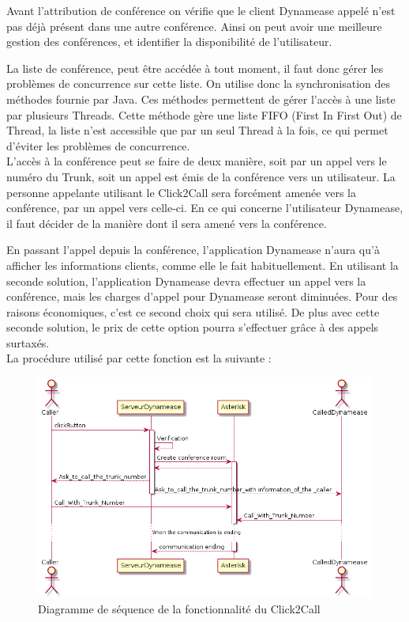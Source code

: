 Avant l'attribution de conférence on vérifie que le client Dynamease appelé n'est pas déjà présent dans une autre conférence. Ainsi on peut avoir une meilleure gestion des conférences, et identifier la disponibilité de l'utilisateur.

La liste de conférence, peut être accédée à tout moment, il faut donc gérer les problèmes de concurrence sur cette liste. On utilise donc la synchronisation des méthodes fournie par Java. Ces méthodes permettent de gérer l'accès à une liste par plusieurs Threads. Cette méthode gère une liste FIFO (First In First Out) de Thread, la liste n'est accessible que par un seul Thread à la fois, ce qui permet d'éviter les problèmes de concurrence.\\

L'accès à la conférence peut se faire de deux manière, soit par un appel vers le numéro du Trunk, soit un appel est émis de la conférence vers un utilisateur. La personne appelante utilisant le Click2Call sera forcément amenée vers la conférence, par un appel vers celle-ci. En ce qui concerne l'utilisateur Dynamease, il faut décider de la manière dont il sera amené vers la conférence. 

En passant l'appel depuis la conférence, l'application Dynamease n'aura qu'à afficher les informations clients, comme elle le fait habituellement. En utilisant la seconde solution, l'application Dynamease devra effectuer un appel vers la conférence, mais les charges d'appel pour Dynamease seront diminuées. Pour des raisons économiques, c'est ce second choix qui sera utilisé. De plus avec cette seconde solution, le prix de cette option pourra s'effectuer grâce à des appels surtaxés.\\

La procédure utilisé par cette fonction est la suivante :

\begin{figure}[!h]
	\centering
	\includegraphics[scale=0.7]{img/sequence_click2call.png}
	\caption{\label{sequence_click2call} Diagramme de séquence de la fonctionnalité du Click2Call}
\end{figure}

